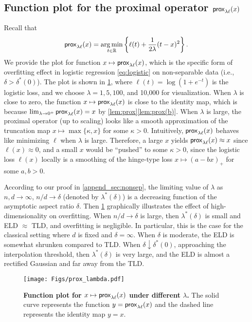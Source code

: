
\subsection{Function plot for the proximal operator $\mathsf{prox}_{\lambda \ell}(x)$}
\label{append_subsec_prox}
Recall that 
\begin{equation*}
    \mathsf{prox}_{\lambda \ell}(x) = \operatorname*{arg\,min}_{t \in \mathbb{R}} \left\{ \ell(t) +  \frac1{2\lambda} (t - x)^2 \right\}.
\end{equation*}
We provide the plot for function $x \mapsto \mathsf{prox}_{\lambda \ell}(x)$, which is the specific form of overfitting effect in logistic regression \cref{eq:logistic} on non-separable data (i.e., $\delta > \delta^*(0)$). The plot is shown in \cref{fig:prox}, where $\ell(t) = \log(1 + e^{-t})$ is the logistic loss, and we choose $\lambda = 1, 5, 100$, and 10,000 for visualization. When $\lambda$ is close to zero, the function $x \mapsto \mathsf{prox}_{\lambda \ell}(x)$ is close to the identity map, which is because $\lim_{\lambda \to 0^+}\mathsf{prox}_{\lambda\ell}(x) = x$ by \cref{lem:prox}\ref{lem:prox(b)}. When $\lambda$ is large, the proximal operator (up to scaling) looks like a smooth approximation of the truncation map $x \mapsto \max\{ \kappa, x\}$ for some $\kappa > 0$. Intuitively, $\mathsf{prox}_{\lambda\ell}(x)$ behaves like minimizing $\ell$ when $\lambda$ is large. Therefore, a large $x$ yields $\mathsf{prox}_{\lambda\ell}(x) \approx x$ since $\ell(x) \approx 0$, and a small $x$ would be ``pushed'' to some $\kappa > 0$, since the logistic loss $\ell(x)$ locally is a smoothing of the hinge-type loss $x \mapsto (a - b x)_+$ for some $a, b > 0$.


According to our proof in \cref{append_sec:nonsep}, the limiting value of $\lambda$ as $n, d \to \infty$, $n/d \to \delta$ (denoted by $\lambda^* (\delta)$) is a decreasing function of the asymptotic aspect ratio $\delta$. Then \cref{fig:prox} graphically illustrates the effect of high-dimensionality on overfitting. When $n/d \to \delta$ is large, then $\lambda^*(\delta)$ is small and ELD $\approx$ TLD, and overfitting is negligible. In particular, this is the case for the classical setting where $d$ is fixed and $\delta = \infty$. When $\delta$ is moderate, the ELD is somewhat shrunken compared to TLD. When $\delta \downarrow \delta^*(0)$, approaching the interpolation threshold, then $\lambda^*(\delta)$ is very large, and the ELD is almost a rectified Gaussian and far away from the TLD.

\begin{figure}[h]
    \centering
    \texttt{[image: Figs/prox\_lambda.pdf]}
    \caption{
    \textbf{Function plot for $x \mapsto \mathsf{prox}_{\lambda \ell}(x)$ under different $\lambda$.} The solid curve represents the function $y = \mathsf{prox}_{\lambda \ell}(x)$ and the dashed line represents the identity map $y = x$.
    }
    \label{fig:prox}
\end{figure}

